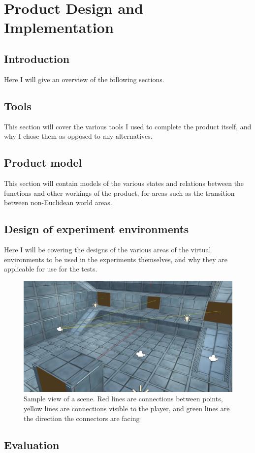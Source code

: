 \chapter[Product]{Product Design and Implementation}
\label{design}

\section{Introduction}
Here I will give an overview of the following sections.

\section{Tools}
This section will cover the various tools I used to complete the product itself, and why I chose them as opposed to any alternatives.

\section{Product model}
This section will contain models of the various states and relations between the functions and other workings of the product, for areas such as the transition between non-Euclidean world areas.

\section{Design of experiment environments}
Here I will be covering the designs of the various areas of the virtual environments to be used in the experiments themselves, and why they are applicable for use for the tests.

\begin{figure}
	\label{design:fig:scene}
	\includegraphics[width=1\textwidth]{Images/Lines_Everywhere.png}
	\centering	
	\caption{Sample view of a scene.
		Red lines are connections between points, 
		yellow lines are connections visible to the player, 
		and green lines are the direction the connectors are facing}
\end{figure}

\section{Evaluation}

